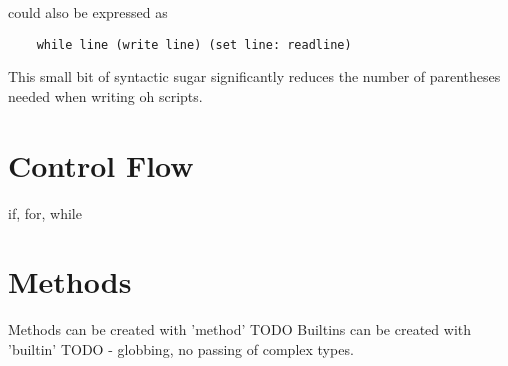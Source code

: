 \documentclass[12pt]{book}
\begin{document}
could also be expressed as

\begin{lstlisting}
	while line (write line) (set line: readline)
\end{lstlisting}

This small bit of syntactic sugar significantly reduces the number of
parentheses needed when writing oh scripts.


\section{Control Flow}

if, for, while


\section{Methods}

Methods can be created with 'method' TODO
Builtins can be created with 'builtin' TODO - globbing, no passing
of complex types.



\end{document}
